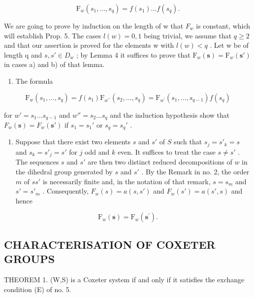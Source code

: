 \[
\mathrm{F} _ {w} (s _ {1}, \dots , s _ {q}) = f (s _ {1}) \dots f (s _ {q}).
\]

We are going to prove by induction on the length of w that \(F_{w}\) is constant, which will establish Prop. 5. The cases \(l(w) = 0, 1\) being trivial, we assume that \(q \geqslant 2\) and that our assertion is proved for the elements w with \(l(w) < q\) . Let w be of length q and \(s, s' \in D_w\) ; by Lemma 4 it suffices to prove that \(\mathrm{F}_{w}(\mathbf{s}) = \mathrm{F}_{w}(\mathbf{s}')\) in cases a) and b) of that lemma.

\begin{enumerate}
\def\labelenumi{\alph{enumi})}
\tightlist
\item
  The formula
\end{enumerate}

\[
\mathrm{F} _ {w} \left(s _ {1}, \dots , s _ {q}\right) = f \left(s _ {1}\right) \mathrm{F} _ {w ^ {\prime \prime}} \left(s _ {2}, \dots , s _ {q}\right) = \mathrm{F} _ {w ^ {\prime}} \left(s _ {1}, \dots , s _ {q - 1}\right) f \left(s _ {q}\right)
\]

for \(w' = s_1 \ldots s_{q-1}\) and \(w'' = s_2 \ldots s_q\) and the induction hypothesis show that \(F_w(\mathbf{s}) = F_w(\mathbf{s}')\) if \(s_1 = s_1'\) or \(s_q = s_q'\) .

\begin{enumerate}
\def\labelenumi{\alph{enumi})}
\setcounter{enumi}{1}
\tightlist
\item
  Suppose that there exist two elements \(s\) and \(s'\) of \(S\) such that \(s_j = s'_k = s\) and \(s_k = s'_j = s'\) for \(j\) odd and \(k\) even. It suffices to treat the case \(s \neq s'\) . The sequences \(s\) and \(s'\) are then two distinct reduced decompositions of \(w\) in the dihedral group generated by \(s\) and \(s'\) . By the Remark in no. 2, the order \(m\) of \(ss'\) is necessarily finite and, in the notation of that remark, \(s = s_m\) and \(s' = s'_m\) . Consequently, \(F_w(s) = a(s, s')\) and \(F_w(s') = a(s', s)\) and hence
\end{enumerate}

\[
\mathrm{F} _ {w} (\mathbf {s}) = \mathrm{F} _ {w} (\mathbf {s} ^ {\prime}).
\]

\subsection{CHARACTERISATION OF COXETER GROUPS}

THEOREM 1. (W,S) is a Coxeter system if and only if it satisfies the exchange condition (E) of no. 5.

